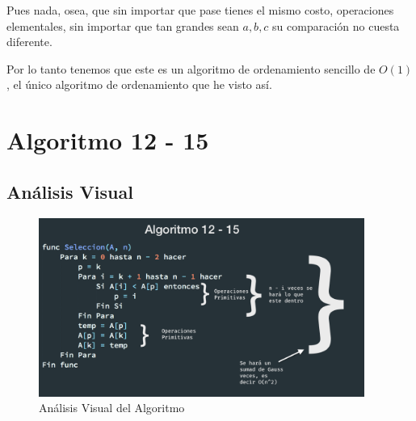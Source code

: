 \documentclass[12pt, fleqn]{article}                            %
\theoremstyle{break}                                            %
\begin{document}
        Pues nada, osea, que sin importar que pase tienes el mismo costo, operaciones elementales,
        sin importar que tan grandes sean $a, b, c$ su comparación no cuesta diferente.

        Por lo tanto tenemos que este es un algoritmo de ordenamiento sencillo de $O(1)$, el único
        algoritmo de ordenamiento que he visto así.





\clearpage
\section{Algoritmo 12 - 15}


    \subsection{Análisis Visual}

        \begin{figure}[h]
            \centering
            \includegraphics[width=0.95\textwidth]{Algoritmo12}
            \caption{Análisis Visual del Algoritmo}
        \end{figure}

    \vspace{1em}
\end{document}
